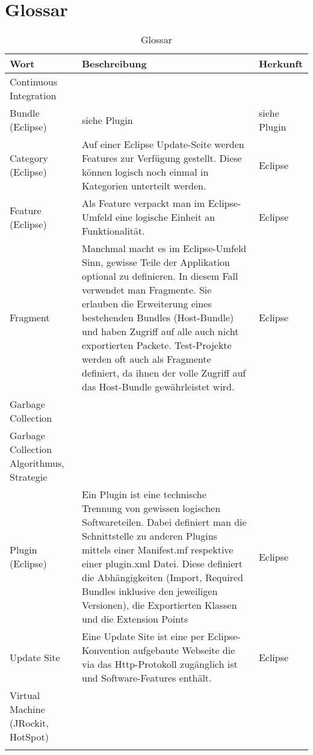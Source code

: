 \chapter*{Glossar}\label{glossar}
  \begin{longtable}{|p{5cm}|p{6cm}|p{3cm}|}
\hline
  \textbf{Wort} & \textbf{Beschreibung} & \textbf{Herkunft}\\\hline
  Continuous Integration  &&\\\hline
  Bundle (Eclipse) & siehe Plugin & siehe Plugin\\\hline
  Category (Eclipse) & Auf einer Eclipse Update-Seite werden Features zur Verfügung gestellt. Diese können logisch noch einmal in Kategorien unterteilt werden. & Eclipse\\\hline
  Feature (Eclipse) & Als Feature verpackt man im Eclipse-Umfeld eine logische Einheit an Funktionalität. & Eclipse\\\hline
  Fragment & Manchmal macht es im Eclipse-Umfeld Sinn, gewisse Teile der Applikation optional zu definieren. In diesem Fall verwendet man Fragmente. Sie erlauben die Erweiterung eines bestehenden Bundles (Host-Bundle) und haben Zugriff auf alle auch nicht exportierten Packete. Test-Projekte werden oft auch als Fragmente definiert, da ihnen der volle Zugriff auf das Host-Bundle gewährleistet wird. & Eclipse\\\hline
  Garbage Collection & & \\\hline
  Garbage Collection Algorithmus, Strategie & & \\\hline
  Plugin (Eclipse) & Ein Plugin ist eine technische Trennung von gewissen logischen Softwareteilen. Dabei definiert man die Schnittstelle zu anderen Plugins mittels einer Manifest.mf respektive einer plugin.xml Datei. Diese definiert die Abhängigkeiten (Import, Required Bundles inklusive den jeweiligen Versionen), die Exportierten Klassen und die Extension Points  & Eclipse\\\hline
  Update Site & Eine Update Site ist eine per Eclipse-Konvention aufgebaute Webseite die via das Http-Protokoll zugänglich ist und Software-Features enthält.& Eclipse\\\hline
  Virtual Machine (JRockit, HotSpot) & & \\\hline
      \caption{Glossar}\\
  \end{longtable}


